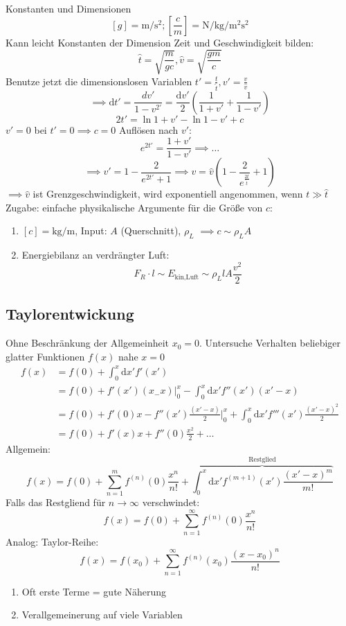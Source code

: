 \documentclass[a4paper]{scrartcl}
\renewcommand{\d}{\mathrm{d}}
\theoremstyle{definition}
\theoremstyle{plain}
\theoremstyle{remark}
\theoremstyle{remark}
\begin{document}
Konstanten und Dimensionen
\[[g] = \si{\meter\per\second\squared};[\frac{c}{m}] = \si{\newton\per\kilo\gram\per\meter\squared\second\squared}\]
Kann leicht Konstanten der Dimension Zeit und Geschwindigkeit bilden:
\[\hat{t} = \sqrt{\frac{m}{g c}},\hat{v} = \sqrt{\frac{g m}{c}}\]
Benutze jetzt die dimensionslosen Variablen $t' = \frac{t}{\hat{t}},v'=\frac{v}{\hat{v}}$
\[\implies \d t' = \frac{d v'}{1 - v^{2\prime}} = \frac{\d v'}{2}(\frac{1}{1 + v'} + \frac{1}{1 - v'})\]
\[2t' = \ln{1 + v'} - \ln{1 - v'} + c\]
$v' = 0$ bei $t' = 0 \implies c = 0$
Auflösen nach $v'$: \[e^{2t'} = \frac{1 + v'}{1 - v'} \implies \ldots\]
\[\implies v' = 1 - \frac{2}{e^{2t'} + 1} \implies v = \hat{v}(1 - \frac{2}{e^{\frac{2t}{\hat{t}}}} + 1)\]
$\implies \hat{v}$ ist Grenzgeschwindigkeit, wird exponentiell angenommen, wenn $t \gg \hat{t}$ \\

Zugabe: einfache physikalische Argumente für die Größe von $c$:
\begin{enumerate}
\item $[c] = \si{\kilo\gram\per\meter}$, Input: $A$ (Querschnitt), $\rho_L$
         $\implies c \sim \rho_L A$
\item Energiebilanz an verdrängter Luft: \[F_R\cdot l \sim E_{\text{kin,Luft}}\sim\rho_L l A \frac{v^2}{2}\]
\end{enumerate}
\subsection{Taylorentwickung}
\label{sec-3-4}
Ohne Beschränkung der Allgemeinheit $x_0 = 0$. Untersuche Verhalten beliebiger glatter Funktionen $f(x)$ nahe $x = 0$
\begin{align*}
f(x) &= f(0) + \int_0^x\d x' f'(x') \\
&= f(0) + f'(x')(x_ - x)\Big|_0^x - \int_0^x\d x' f''(x')(x'-x) \\
&= f(0) + f'(0)x - f''(x')\frac{(x' - x)}{2}\Big|_0^x + \int_0^x\d x' f'''(x')\frac{(x' - x)^2}{2} \\
&= f(0) + f'(x)x + f''(0)\frac{x^2}{2} + \ldots
\end{align*}
Allgemein:
\[f(x) = f(0) + \sum_{n=1}^m f^{(n)}(0)\frac{x^n}{n!}+\overbrace{\int_0^x \d x' f^{(m+1)}(x')\frac{(x' - x)^m}{m!}}^{\text{Restglied}}\]
Falls das Restgliend für $n\to\infty$ verschwindet:
\[f(x) = f(0) + \sum_{n=1}^\infty f^{(n)}(0)\frac{x^n}{n!}\]
Analog:
Taylor-Reihe: \[f(x) = f(x_0) + \sum_{n=1}^\infty f^{(n)}(x_0)\frac{(x - x_0)^n}{n!}\]
\begin{enumerate}
\item Oft erste Terme = gute Näherung
\item Verallgemeinerung auf viele Variablen
\end{enumerate}
\end{document}
